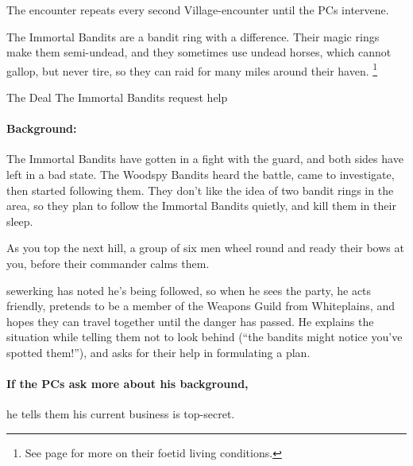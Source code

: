 \begin{multicols}{2}
The encounter repeats every second Village-encounter until the PCs intervene.


\resumecontents[Town]

\stopcontents[sq]


\stopcontents[Town]

\startcontents[sq]

\sqminitoc

\noindent
The Immortal Bandits are a bandit ring with a difference.
Their magic rings make them semi-undead, and they sometimes use undead horses, which cannot gallop, but never tire, so they can raid for many miles around their haven.%
\footnote{See page \pageref{necromancers_lair} for more on their foetid living conditions.}

{The Deal}%
{The Immortal Bandits request help}%

\paragraph{Background:}
The Immortal Bandits have gotten in a fight with the \gls{guard}, and both sides have left in a bad state.
The Woodspy Bandits heard the battle, came to investigate, then started following them.
They don't like the idea of two bandit rings in the area, so they plan to follow the Immortal Bandits quietly, and kill them in their sleep.

\begin{boxtext}

  As you top the next hill, a group of six men wheel round and ready their bows at you, before their commander calms them.

\end{boxtext}

\Gls{sewerking} has noted he's being followed, so when he sees the party, he acts friendly, pretends to be a member of the Weapons Guild from Whiteplains, and hopes they can travel together until the danger has passed.
He explains the situation while telling them not to look behind (``the bandits might notice you've spotted them!''), and asks for their help in formulating a plan.

\paragraph{If the PCs ask more about his background,}
he tells them his current business is top-secret.


\end{multicols}
